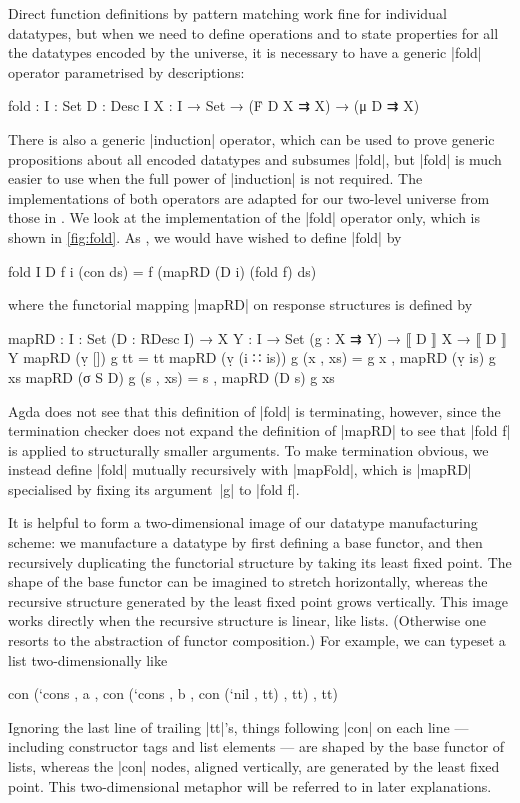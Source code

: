 Direct function definitions by pattern matching work fine for individual datatypes, but when we need to define operations and to state properties for all the datatypes encoded by the universe, it is necessary to have a generic |fold| operator parametrised by descriptions:
\begin{code}
fold : {I : Set} {D : Desc I} {X : I → Set} → (Ḟ D X ⇉ X) → (μ D ⇉ X)
\end{code}
There is also a generic |induction| operator, which can be used to prove generic propositions about all encoded datatypes and subsumes |fold|, but |fold| is much easier to use when the full power of |induction| is not required.
The implementations of both operators are adapted for our two-level universe from those in .
We look at the implementation of the |fold| operator only, which is shown in \autoref{fig:fold}.
As \citeauthor{McBride-ornaments}, we would have wished to define |fold| by
\begin{code}
fold {I} {D} f {i} (con ds) = f (mapRD (D i) (fold f) ds)
\end{code}
where the functorial mapping |mapRD| on response structures is defined by
\begin{code}
mapRD :  {I : Set} (D : RDesc I) →
         {X Y : I → Set} (g : X ⇉ Y) → ⟦ D ⟧ X → ⟦ D ⟧ Y
mapRD (ṿ [])        g tt        = tt
mapRD (ṿ (i ∷ is))  g (x , xs)  = g x , mapRD (ṿ is) g xs
mapRD (σ S D)       g (s , xs)  = s , mapRD (D s) g xs
\end{code}
Agda does not see that this definition of |fold| is terminating, however, since the termination checker does not expand the definition of |mapRD| to see that |fold f| is applied to structurally smaller arguments.
To make termination obvious, we instead define |fold| mutually recursively with |mapFold|, which is |mapRD| specialised by fixing its argument~|g| to |fold f|.

It is helpful to form a two-dimensional image of our datatype manufacturing scheme:
we manufacture a datatype by first defining a base functor, and then recursively duplicating the functorial structure by taking its least fixed point.
The shape of the base functor can be imagined to stretch horizontally, whereas the recursive structure generated by the least fixed point grows vertically.
This image works directly when the recursive structure is linear, like lists.
(Otherwise one resorts to the abstraction of functor composition.)
For example, we can typeset a list two-dimensionally like
\begin{code}
con (`cons  , a  ,
con (`cons  , b  ,
con (`nil   ,
      tt) , tt) , tt)
\end{code}
Ignoring the last line of trailing |tt|'s, things following |con| on each line --- including constructor tags and list elements --- are shaped by the base functor of lists, whereas the |con| nodes, aligned vertically, are generated by the least fixed point.
This two-dimensional metaphor will be referred to in later explanations.

